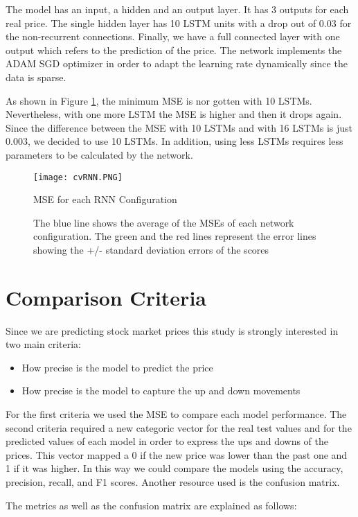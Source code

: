 The model has an input, a hidden and an output layer. It has 3 outputs for each real price. The single hidden layer has 10 LSTM units with a drop out of 0.03 for the non-recurrent connections. Finally, we have a full connected layer with one output which refers to the prediction of the price. The network implements the  ADAM SGD optimizer in order to adapt the learning rate dynamically since the data is sparse. 

As shown in Figure \ref{fig:cvRNN}, the minimum MSE is nor gotten with 10 LSTMs. Nevertheless, with one more LSTM the MSE is higher and then it drops again. Since the difference between the MSE with 10 LSTMs and with 16 LSTMs is just 0.003, we decided to use 10 LSTMs. In addition, using less LSTMs requires less parameters to be calculated by the network.  

\begin{figure}[h]
\centering
\texttt{[image: cvRNN.PNG]}
\caption{MSE for each RNN Configuration}
\caption*{The blue line shows the average of the MSEs of each network configuration. The green and the red lines represent the error lines showing the +/- standard deviation errors of the scores}
\label{fig:cvRNN}
\end{figure}

\section{Comparison Criteria}

Since we are predicting stock market prices this study is strongly interested in two main criteria:

\begin{itemize}
\item How precise is the model to predict the price
\item How precise is the model to capture the up and down movements
\end{itemize}

For the first criteria we used the MSE to compare each model performance. The second criteria required a new categoric vector for the real test values and for the predicted values of each model in order to express the ups and downs of the prices. This vector mapped a 0 if the new price was lower than the past one and 1 if it was higher. In this way we could compare the models using the accuracy, precision, recall, and F1 scores. Another resource used is the confusion matrix. 

The metrics as well as the confusion matrix are explained as follows:

